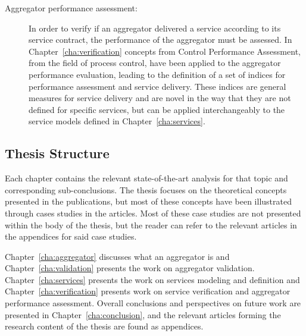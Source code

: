 \begin{description}
	\item[Aggregator performance assessment:] In order to verify if an aggregator delivered a service according to its service contract, the performance of the aggregator must be assessed. In Chapter~\ref{cha:verification} concepts from Control Performance Assessment, \ie from the field of process control, have been applied to the aggregator performance evaluation, leading to the definition of a set of indices for performance assessment and service delivery. These indices are general measures for service delivery and are novel in the way that they are not defined for specific services, but can be applied interchangeably to the service models defined in Chapter~\ref{cha:services}.
\end{description}

\subsection*{Thesis Structure}
Each chapter contains the relevant state-of-the-art analysis for that topic and corresponding sub-conclusions. The thesis focuses on the theoretical concepts presented in the publications, but most of these concepts have been illustrated through cases studies in the articles. Most of these case studies are not presented within the body of the thesis, but the reader can refer to the relevant articles in the appendices for said case studies.

Chapter~\ref{cha:aggregator} discusses what an aggregator is and Chapter~\ref{cha:validation} presents the work on aggregator validation. Chapter~\ref{cha:services} presents the work on services modeling and definition and Chapter~\ref{cha:verification} presents work on service verification and aggregator performance assessment. Overall conclusions and perspectives on future work are presented in Chapter~\ref{cha:conclusion}, and the relevant articles forming the research content of the thesis are found as appendices. 




